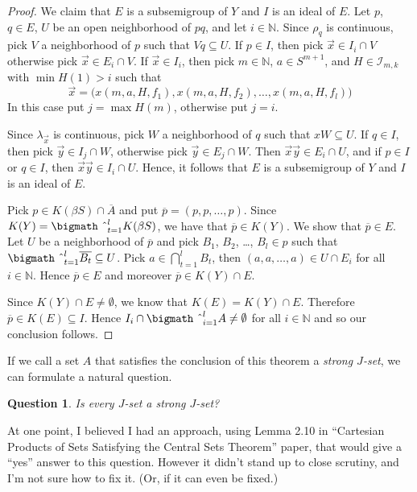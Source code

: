 \documentclass[12pt]{letter}
\theoremstyle{plain}
\newtheorem*{ques}{Question}
\theoremstyle{definition}
\newcommand{\bbN}{\mathbb{N}}
\newcommand{\calI}{\mathcal{I}}
\newcommand{\bigtimes}{\hbox{\bigmath \char'2}}
\begin{document}
\begin{letter}{}
\begin{proof}
  We claim that $E$ is a subsemigroup of $Y$ and $I$ is an ideal of
  $E$. 
  Let $p$, $q \in E$, $U$ be an open neighborhood of $pq$, and let $i
  \in \bbN$. 
  Since $\rho_q$ is continuous, pick $V$ a neighborhood of $p$ such
  that $Vq \subseteq U$. 
  If $p \in I$, then pick $\vec{x} \in I_i \cap V$ otherwise pick
  $\vec{x} \in E_i \cap V$.
  If $\vec{x} \in I_i$, then pick $m \in \bbN$, $a \in S^{m+1}$, and
  $H \in \calI_{m,k}$ with $\min H(1) > i$ such that
  \[
    \vec{x} = \bigl( x(m, a, H, f_1), x(m, a, H, f_2), \ldots, x(m,
    a, H, f_l) \bigr)
  \]
  In this case put $j = \max H(m)$, otherwise put $j=i$. 

  Since $\lambda_{\vec{x}}$ is continuous, pick $W$ a neighborhood of
  $q$ such that $xW \subseteq U$. 
  If $q \in I$, then pick $\vec{y} \in I_j \cap W$, otherwise pick
  $\vec{y} \in E_j \cap W$.
  Then $\vec{x} \vec{y} \in E_i \cap U$, and if $p \in I$ or $q \in
  I$, then $\vec{x} \vec{y} \in I_i \cap U$. 
  Hence, it follows that $E$ is a subsemigroup of $Y$ and $I$ is an
  ideal of $E$.

  Pick $p \in K(\beta S) \cap \overline{A}$ and put $\overline{p} =
  (p, p, \ldots, p)$. 
  Since $K(Y) = \bigtimes_{t=1}^l K(\beta S)$, we have that
  $\overline{p} \in K(Y)$. 
  We show that $\overline{p} \in E$.
  Let $U$ be a neighborhood of $\overline{p}$ and pick $B_1$, $B_2$,
  \dots, $B_l \in p$ such that $\bigtimes_{t=1}^l \overline{B_t}
  \subseteq U$. 
  Pick $a \in \bigcap_{t=1}^l B_t$, then $(a, a, \ldots, a) \in U \cap
  E_i$ for all $i \in \bbN$. 
  Hence $\overline{p} \in E$ and moreover $\overline{p} \in K(Y) \cap
  E$.

  Since $K(Y) \cap E \ne \emptyset$, we know that $K(E) = K(Y) \cap
  E$.
  Therefore $\overline{p} \in K(E) \subseteq I$.
  Hence $I_i \cap \bigtimes_{i=1}^l A \ne \emptyset$ for all $i \in
  \bbN$ and so our conclusion follows.
\end{proof}

If we call a set $A$ that satisfies the conclusion of this theorem a
\textsl{strong $J$-set}, we can formulate a natural question. 

\begin{ques}
  Is every $J$-set a strong $J$-set?
\end{ques}

At one point, I believed I had an approach, using Lemma 2.10 in
``Cartesian Products of Sets Satisfying the Central Sets Theorem''
paper, that would give a ``yes'' answer to this question. 
However it didn't stand up to close scrutiny, and I'm not sure how to
fix it. (Or, if it can even be fixed.)


\end{letter}
\end{document}
